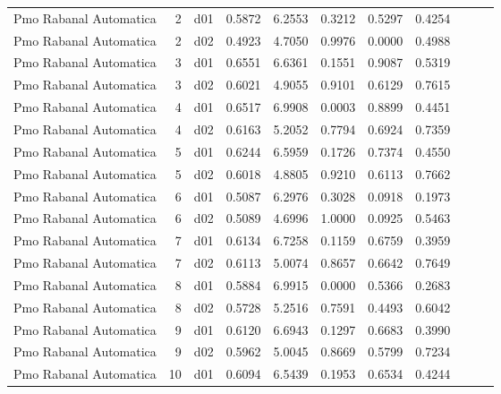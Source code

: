 \begin{landscape}
\begin{longtable}{p{2cm}rrrrrrrrrr}
 Pmo Rabanal Automatica   &          2 &     d01 &   0.5872 &  6.2553 &        0.3212 &           0.5297 &  0.4254 \\
 Pmo Rabanal Automatica   &          2 &     d02 &   0.4923 &  4.7050 &        0.9976 &           0.0000 &  0.4988 \\
 Pmo Rabanal Automatica   &          3 &     d01 &   0.6551 &  6.6361 &        0.1551 &           0.9087 &  0.5319 \\
 Pmo Rabanal Automatica   &          3 &     d02 &   0.6021 &  4.9055 &        0.9101 &           0.6129 &  0.7615 \\
 Pmo Rabanal Automatica   &          4 &     d01 &   0.6517 &  6.9908 &        0.0003 &           0.8899 &  0.4451 \\
 Pmo Rabanal Automatica   &          4 &     d02 &   0.6163 &  5.2052 &        0.7794 &           0.6924 &  0.7359 \\
 Pmo Rabanal Automatica   &          5 &     d01 &   0.6244 &  6.5959 &        0.1726 &           0.7374 &  0.4550 \\
 Pmo Rabanal Automatica   &          5 &     d02 &   0.6018 &  4.8805 &        0.9210 &           0.6113 &  0.7662 \\
 Pmo Rabanal Automatica   &          6 &     d01 &   0.5087 &  6.2976 &        0.3028 &           0.0918 &  0.1973 \\
 Pmo Rabanal Automatica   &          6 &     d02 &   0.5089 &  4.6996 &        1.0000 &           0.0925 &  0.5463 \\
 Pmo Rabanal Automatica   &          7 &     d01 &   0.6134 &  6.7258 &        0.1159 &           0.6759 &  0.3959 \\
 Pmo Rabanal Automatica   &          7 &     d02 &   0.6113 &  5.0074 &        0.8657 &           0.6642 &  0.7649 \\
 Pmo Rabanal Automatica   &          8 &     d01 &   0.5884 &  6.9915 &        0.0000 &           0.5366 &  0.2683 \\
 Pmo Rabanal Automatica   &          8 &     d02 &   0.5728 &  5.2516 &        0.7591 &           0.4493 &  0.6042 \\
 Pmo Rabanal Automatica   &          9 &     d01 &   0.6120 &  6.6943 &        0.1297 &           0.6683 &  0.3990 \\
 Pmo Rabanal Automatica   &          9 &     d02 &   0.5962 &  5.0045 &        0.8669 &           0.5799 &  0.7234 \\
 Pmo Rabanal Automatica   &         10 &     d01 &   0.6094 &  6.5439 &        0.1953 &           0.6534 &  0.4244 \\

\end{longtable}
\end{landscape}
